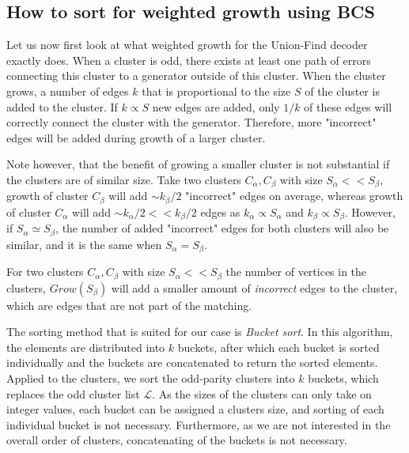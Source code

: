 \subsection{How to sort for weighted growth using BCS}

Let us now first look at what weighted growth for the Union-Find decoder exactly does. When a cluster is odd, there exists at least one path of errors connecting this cluster to a generator outside of this cluster. When the cluster grows, a number of edges $k$ that is proportional to the size $S$ of the cluster is added to the cluster. If $k \propto S$ new edges are added, only $1/k$ of these edges will correctly connect the cluster with the generator. Therefore, more "incorrect" edges will be added during growth of a larger cluster.

Note however, that the benefit of growing a smaller cluster is not substantial if the clusters are of similar size. Take two clusters $C_\alpha, C_\beta$ with size $S_\alpha <<S_\beta$, growth of cluster $C_\beta$ will add $\sim k_{\beta}/2$ "incorrect" edges on average, whereas growth of cluster $C_\alpha$ will add $\sim k_{\alpha}/2 << k_{\beta}/2$ edges as $k_{\alpha} \propto S_\alpha$ and $k_{\beta} \propto S_\beta$. However, if $S_\alpha \simeq S_\beta$, the number of added "incorrect" edges for both clusters will also be similar, and it is the same when $S_\alpha = S_\beta$.

\begin{lemma}\label{lem:incorrectedges}
  For two clusters $C_\alpha, C_\beta$ with size $S_\alpha << S_\beta$ the number of vertices in the clusters, $Grow(S_\beta)$ will add a smaller amount of \emph{incorrect} edges to the cluster, which are edges that are not part of the matching.
\end{lemma}

The sorting method that is suited for our case is \emph{Bucket sort}. In this algorithm, the elements are distributed into $k$ buckets, after which each bucket is sorted individually and the buckets are concatenated to return the sorted elements. Applied to the clusters, we sort the odd-parity clusters into $k$ buckets, which replaces the odd cluster list $\mathcal{L}$. As the sizes of the clusters can only take on integer values, each bucket can be assigned a clusters size, and sorting of each individual bucket is not necessary. Furthermore, as we are not interested in the overall order of clusters, concatenating of the buckets is not necessary.

